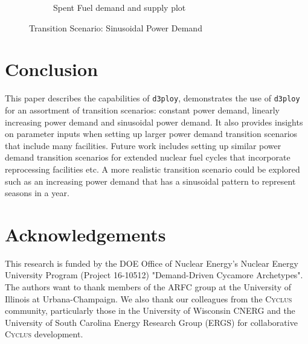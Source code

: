 \documentclass{anstrans}
\newcommand{\Cyclus}{\textsc{Cyclus}\xspace}%
\newcommand{\deploy}{\texttt{d3ploy}\xspace}%
\begin{document}
\begin{figure}[!htbp]
\begin{subfigure}[t]{0.45\textwidth}
        \caption{Spent Fuel demand and supply plot}
        \label{fig:sinetransition-spentfuel}
    \end{subfigure}
    \caption{Transition Scenario: Sinusoidal Power Demand}
\end{figure}

\section{Conclusion}
This paper describes the capabilities of \deploy, demonstrates 
the use of \deploy for an assortment of transition scenarios: 
constant power demand, linearly increasing power demand and
sinusoidal power demand.  
It also provides insights on parameter inputs when setting up larger
power demand transition scenarios that include many facilities. 
Future work includes setting up similar power demand transition 
scenarios for extended nuclear fuel cycles that incorporate reprocessing 
facilities etc. 
A more realistic transition scenario could be explored such as an 
increasing power demand that has a sinusoidal pattern to represent 
seasons in a year. 

\nopagebreak
\section{Acknowledgements}
This research is funded by the \gls{DOE} Office of 
Nuclear Energy's Nuclear Energy University Program (Project 16-10512) 
"Demand-Driven Cycamore Archetypes". The authors want to thank 
members of the \gls{ARFC} group at the University of Illinois at 
Urbana-Champaign. 
We also thank our colleagues from the \Cyclus community, 
particularly those in the University of Wisconsin 
\gls{CNERG} and the University of South Carolina Energy Research 
Group (ERGS) for collaborative \Cyclus development.



\end{document}
